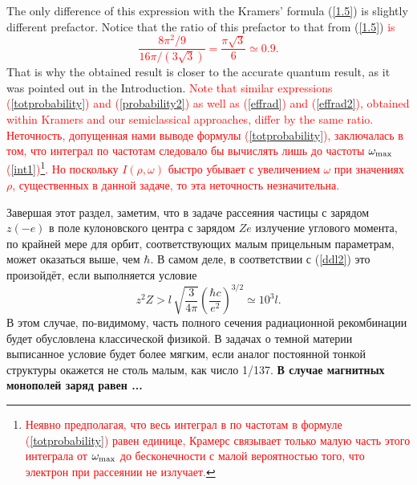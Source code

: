 \documentclass{SovJurn/JETPL}
\begin{document}
The only difference of this expression with the Kramers' formula (\ref{1.5}) is slightly different prefactor. Notice that the ratio of this prefactor to that from (\ref{1.5}) \textcolor{Red}{is
\begin{equation}
\frac{8\pi^2/9}{16\pi/(3\sqrt{3})}=\frac{\pi\sqrt{3}}{6}\simeq 0.9.
\label{ratio}
\end{equation}
}That is why the obtained result is closer to the accurate quantum result, as it was pointed out in the Introduction. \textcolor{Red}{Note that similar expressions (\ref{totprobability}) and (\ref{probability2}) as well as (\ref{effrad}) and (\ref{effrad2}), obtained within Kramers and our semiclassical approaches, differ by the same ratio. Неточность, допущенная нами выводе формулы (\ref{totprobability}), заключалась в том, что интеграл по частотам следовало бы вычислять лишь до частоты $\omega_{\rm max}$ (\ref{int1})}\footnote{\label{4} \textcolor{Red}{Неявно предполагая, что весь интеграл в по частотам в формуле (\ref{totprobability}) равен единице, Крамерс \cite{kramers1923xciii} связывает только малую часть  этого интеграла от $\omega_{\rm max}$ до бесконечности с малой вероятностью того, что электрон при рассеянии не излучает.}}\textcolor{Red}{. Но поскольку $I(\rho,\omega)$ быстро убывает с увеличением $\omega$ при значениях $\rho$, существенных в данной задаче, то эта неточность незначительна.} 

Завершая этот раздел, заметим, что в задаче рассеяния частицы с зарядом $z(-e)$ в поле кулоновского центра с зарядом $Ze$ излучение углового момента, по крайней мере для орбит, соответствующих малым прицельным параметрам, может оказаться выше, чем $\hbar$. В самом деле, в соответствии с (\ref{ddl2}) это произойдёт, если выполняется условие
\begin{equation}
z^2Z>l\, \sqrt{\frac{3}{4\pi}} \left(\frac{\hbar c}{e^2}\right)^{3/2}\simeq 10^3 l.
\label{final}
\end{equation}
В этом случае, по-видимому, часть полного сечения радиационной рекомбинации будет обусловлена классической физикой. В задачах о темной материи выписанное условие будет более мягким, если аналог постоянной тонкой структуры окажется не столь малым, как число 1/137. \textbf{В случае магнитных монополей заряд равен ...}
\end{document}
